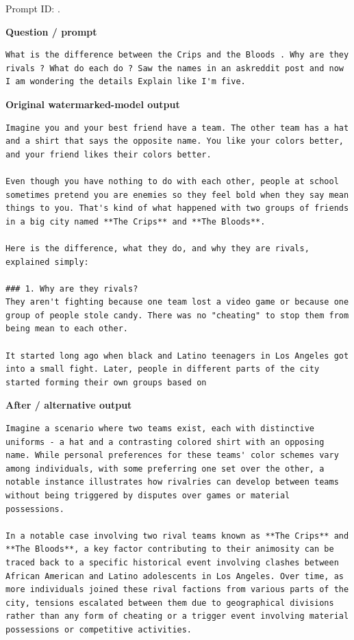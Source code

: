 Prompt ID:
\texttt{}.

\textbf{Question / prompt}

\begin{Verbatim}
What is the difference between the Crips and the Bloods . Why are they rivals ? What do each do ? Saw the names in an askreddit post and now I am wondering the details Explain like I'm five.
\end{Verbatim}

\textbf{Original watermarked-model output}

\begin{Verbatim}
Imagine you and your best friend have a team. The other team has a hat and a shirt that says the opposite name. You like your colors better, and your friend likes their colors better.

Even though you have nothing to do with each other, people at school sometimes pretend you are enemies so they feel bold when they say mean things to you. That's kind of what happened with two groups of friends in a big city named **The Crips** and **The Bloods**.

Here is the difference, what they do, and why they are rivals, explained simply:

### 1. Why are they rivals?
They aren't fighting because one team lost a video game or because one group of people stole candy. There was no "cheating" to stop them from being mean to each other.

It started long ago when black and Latino teenagers in Los Angeles got into a small fight. Later, people in different parts of the city started forming their own groups based on
\end{Verbatim}

\textbf{After / alternative output}

\begin{Verbatim}
Imagine a scenario where two teams exist, each with distinctive uniforms - a hat and a contrasting colored shirt with an opposing name. While personal preferences for these teams' color schemes vary among individuals, with some preferring one set over the other, a notable instance illustrates how rivalries can develop between teams without being triggered by disputes over games or material possessions.

In a notable case involving two rival teams known as **The Crips** and **The Bloods**, a key factor contributing to their animosity can be traced back to a specific historical event involving clashes between African American and Latino adolescents in Los Angeles. Over time, as more individuals joined these rival factions from various parts of the city, tensions escalated between them due to geographical divisions rather than any form of cheating or a trigger event involving material possessions or competitive activities.
\end{Verbatim}

